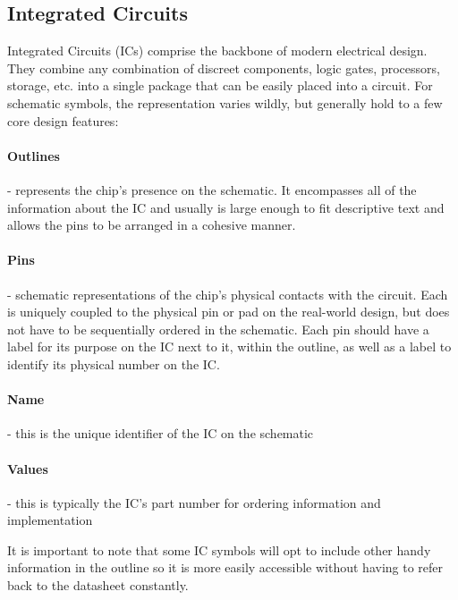     \subsection{Integrated Circuits}
    Integrated Circuits (ICs) comprise the backbone of modern electrical design.
    They combine any combination of discreet components, logic gates, processors, storage, etc. into a single package that can be easily placed into a circuit.
    For schematic symbols, the representation varies wildly, but generally hold to a few core design features:
        \paragraph*{Outlines} - represents the chip's presence on the schematic. 
        It encompasses all of the information about the IC and usually is large enough to fit descriptive text and allows the pins to be arranged in a cohesive manner.

        \paragraph*{Pins} - schematic representations of the chip's physical contacts with the circuit. 
        Each is uniquely coupled to the physical pin or pad on the real-world design, but does not have to be sequentially ordered in the schematic.
        Each pin should have a label for its purpose on the IC next to it, within the outline, as well as a label to identify its physical number on the IC.

        \paragraph*{Name} - this is the unique identifier of the IC on the schematic

        \paragraph*{Values} - this is typically the IC's part number for ordering information and implementation

    It is important to note that some IC symbols will opt to include other handy information in the outline so it is more easily accessible without having to refer back to the datasheet constantly.


